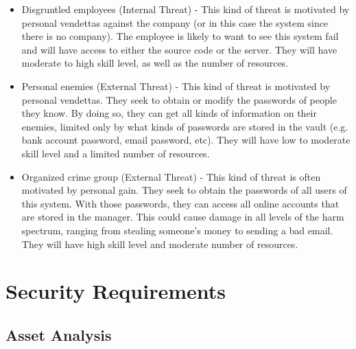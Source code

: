 \documentclass{article}
\begin{document}
\begin{itemize}
  \item Disgruntled employees (Internal Threat) - This kind of threat is motivated by personal vendettas against the company (or in this case the system since there is no company). The employee is likely to want to see this system fail and will have access to either the source code or the server. They will have moderate to high skill level, as well as the number of resources.
  \item Personal enemies (External Threat) - This kind of threat is motivated by personal vendettas. They seek to obtain or modify the passwords of people they know. By doing so, they can get all kinds of information on their enemies, limited only by what kinds of passwords are stored in the vault (e.g. bank account password, email password, etc). They will have low to moderate skill level and a limited number of resources.
  \item Organized crime group (External Threat) - This kind of threat is often motivated by personal gain. They seek to obtain the passwords of all users of this system. With those passwords, they can access all online accounts that are stored in the manager. This could cause damage in all levels of the harm spectrum, ranging from stealing someone’s money to sending a bad email. They will have high skill level and moderate number of resources.
\end{itemize}

\section{Security Requirements}
\label{sec:security_requirements}

\subsection{Asset Analysis}
\label{sub:asset_analysis}
\end{document}
